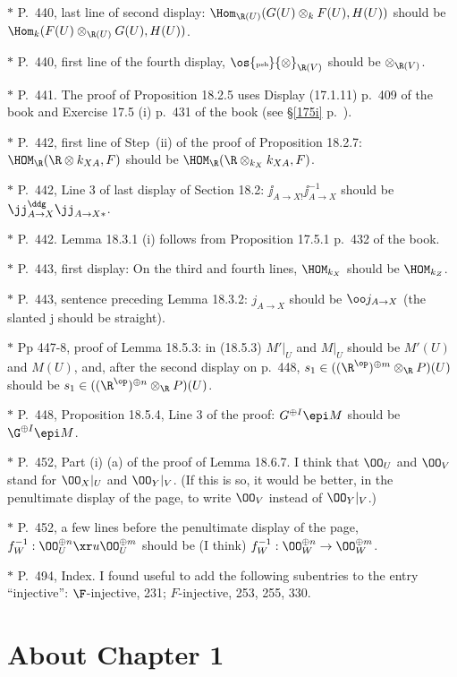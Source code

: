 \documentclass[12pt]{article}
\theoremstyle{remark}
\theoremstyle{definition}
\begin{document}
\nn$*$ P.~440, last line of second display: $\Hom_{\R(U)}(G(U)\otimes_kF(U),H(U))$ should be $\Hom_k(F(U)\otimes_{\R(U)}G(U),H(U))$. 

\nn$*$ P.~440, first line of the fourth display, $\os{\text{\tiny psh}}{\otimes}_{\R(V)}$ should be $\otimes_{\R(V)}$. 

\nn$*$ P.~441. The proof of Proposition 18.2.5 uses Display (17.1.11) p.~409 of the book and Exercise 17.5 (i) p.~431 of the book (see \S\ref{175i} p.~).  

\nn$*$ P.~442, first line of Step~(ii) of the proof of Proposition 18.2.7: $\HOM_\R(\R\otimes k_{XA},F)$ should be $\HOM_\R(\R\otimes_{k_X}k_{XA},F)$. 

\nn$*$ P.~442, Line 3 of last display of Section 18.2: $\jj_{A\to X!}\jj_{A\to X}^{-1}$ should be $\jj_{A\to X}^\ddg\jj_{A\to X*}$. 

\nn$*$ P.~442. Lemma 18.3.1 (i) follows from Proposition 17.5.1 p.~432 of the book. 

\nn$*$ P.~443, first display: On the third and fourth lines, $\HOM_{k_X}$ should be $\HOM_{k_Z}$. 

\nn$*$ P.~443, sentence preceding Lemma 18.3.2: $j_{A\to X}$ should be $\oo j_{A\to X}$ (the slanted j should be straight). 

\nn$*$ Pp 447-8, proof of Lemma 18.5.3: in (18.5.3) $M'|_U$ and $M|_U$ should be $M'(U)$ and $M(U)$, and, after the second display on p.~448, $s_1\in((\R^{\op})^{\oplus m}\otimes_\R P)(U)$ should be $s_1\in((\R^{\op})^{\oplus n}\otimes_\R P)(U)$.

\nn$*$ P.~448, Proposition 18.5.4, Line 3 of the proof: $G^{\oplus I}\epi M$ should be $\G^{\oplus I}\epi M$.

\nn$*$ P.~452, Part (i) (a) of the proof of Lemma 18.6.7. I think that $\OO_U$ and $\OO_V$ stand for $\OO_X|_U$ and $\OO_Y|_V$. (If this is so, it would be better, in the penultimate display of the page, to write $\OO_V$ instead of $\OO_Y|_V$.) 

\nn$*$ P.~452, a few lines before the penultimate display of the page, $f_W^{-1}:\OO_U^{\oplus n}\xr u\OO_U^{\oplus m}$ should be (I think) $f_W^{-1}:\OO_W^{\oplus n}\to\OO_W^{\oplus m}$.

\nn$*$ P.~494, Index. I found useful to add the following subentries to the entry ``injective'': $\F$-injective, 231; $F$-injective, 253, 255, 330.


\section{About Chapter 1}
\end{document}
